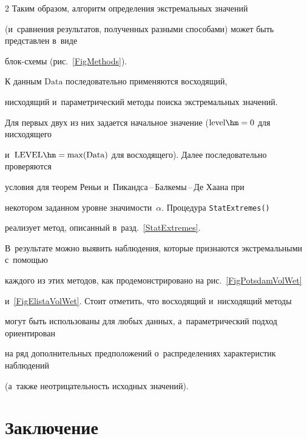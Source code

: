 \begin{multicols}{2}
Таким образом, алгоритм определения экстремальных значений 


(и~сравнения результатов, полученных разными способами) может быть пред\-став\-лен в~виде 


 блок-схе\-мы (рис.~\ref{FigMethods}).











К данным $\mathrm{Data}$ последовательно применяются восходящий, 


нисходящий и~параметрический методы поиска экстремальных значений. 


Для первых двух из них задается начальное значение ($\mathrm{level}\hm=0$ для нисходящего 


и~$\mathrm{LEVEL}\hm=\max(\mathrm{Data})$ для восходящего). Далее последовательно проверяются 


условия для теорем Реньи и~Пи\-канд\-са\,--\,Бал\-ке\-мы\,--\,Де Хаана при 


некотором заданном уровне зна\-чи\-мости~$\alpha$. Процедура \verb"StatExtremes()" 


реализует метод, описанный в~разд.~\ref{StatExtremes}. 


В~результате можно выявить наблюдения, которые признаются экстремальными с~помощью 


каждого из этих методов, как продемонстрировано на рис.~\ref{FigPotsdamVolWet} 


и~\ref{FigElistaVolWet}. Стоит отметить, что восходящий и~нисходящий методы 


могут быть использованы для любых данных, а~па\-ра\-мет\-ри\-че\-ский подход ориентирован 


на ряд дополнительных предположений о~распределениях характеристик наблюдений 


(а~также неотрицательность исходных значений).










\section{Заключение}






\end{multicols}
